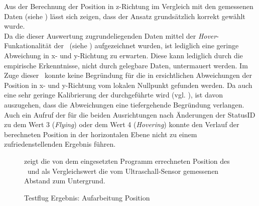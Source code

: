 \FloatBarrier
{}


Aus der Berechnung der Position in z-Richtung im Vergleich mit den gemessenen Daten (siehe ) lässt sich zeigen, dass der Ansatz grundsätzlich korrekt gewählt wurde.\\
Da die dieser Auswertung zugrundeliegenden Daten mittel der \textit{Hover}-Funkationalität der \Ar\ (siehe ) aufgezeichnet wurden, ist lediglich eine geringe Abweichung in x- und y-Richtung zu erwarten. Diese kann lediglich durch die empirische Erkenntnisse, nicht durch gelegbare Daten, untermauert werden.
Im Zuge dieser \Arbeit\ konnte keine Begründung für die in  ersichtlichen Abweichungen der Position in x- und y-Richtung vom lokalen Nullpunkt gefunden werden. Da auch eine sehr geringe Kalibrierung der  durchgeführte wird (vgl. ), ist davon auszugehen, dass die Abweichungen eine tiefergehende Begründung verlangen. Auch ein Aufruf der  für die beiden Ausrichtungen nach Änderungen der StatusID zu dem Wert 3 (\textit{Flying}) oder dem Wert 4 (\textit{Hovering}) konnte den Verlauf der berechneten Position in der horizontalen Ebene nicht zu einem zufriedenstellenden Ergebnis führen.

\begin{figure}[ht!]
\vspace{0.25cm}
\begin{center}
\caption{Testflug Ergebnis: Aufarbeitung Position}
\label{fig:FlightPos}
\end{center}

\vspace{0.25cm}
 zeigt die von dem eingesetzten Programm errechneten Position des \Quad[s] \Ar\ und als Vergleichswert die vom Ultraschall-Sensor gemessenen Abstand zum Untergrund.
\end{figure}

